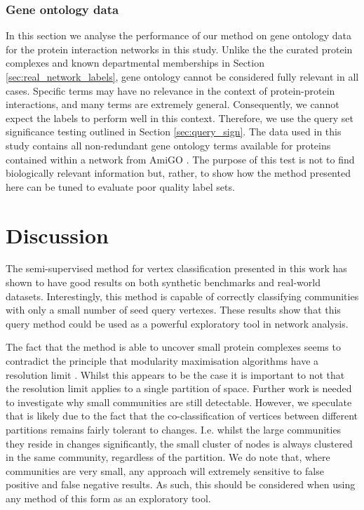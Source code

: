 \documentclass[sigconf]{acmart}
\begin{document}
\subsubsection{Gene ontology data}
\label{sec:go_labels}
In this section we analyse the performance of our method on gene ontology data for the protein interaction networks in this study.
Unlike the the curated protein complexes and known departmental memberships in Section \ref{sec:real_network_labels}, gene ontology cannot be considered fully relevant in all cases.
Specific terms may have no relevance in the context of protein-protein interactions, and many terms are extremely general.
Consequently, we cannot expect the labels to perform well in this context.
Therefore, we use the query set significance testing outlined in Section \ref{sec:query_sign}.
The data used in this study contains all non-redundant gene ontology terms available for proteins contained within a network from AmiGO \cite{carbon2008amigo}.
The purpose of this test is not to find biologically relevant information but, rather, to show how the method presented here can be tuned to evaluate poor quality label sets.

\section{Discussion}
The semi-supervised method for vertex classification presented in this work has shown to have good results on both synthetic benchmarks and real-world datasets.
Interestingly, this method is capable of correctly classifying communities with only a small number of seed query vertexes.
These results show that this query method could be used as a powerful exploratory tool in network analysis.

The fact that the method is able to uncover small protein complexes seems to contradict the principle that modularity maximisation algorithms have a resolution limit \cite{fortunato2007resolution}.
Whilst this appears to be the case it is important to not that the resolution limit applies to a single partition of space.
Further work is needed to investigate why small communities are still detectable.
However, we speculate that is likely due to the fact that the co-classification of vertices between different partitions remains fairly tolerant to changes.
I.e. whilst the large communities they reside in changes significantly, the small cluster of nodes is always clustered in the same community, regardless of the partition.
We do note that, where communities are very small, any approach will extremely sensitive to false positive and false negative results.
As such, this should be considered when using any method of this form as an exploratory tool.
\end{document}
